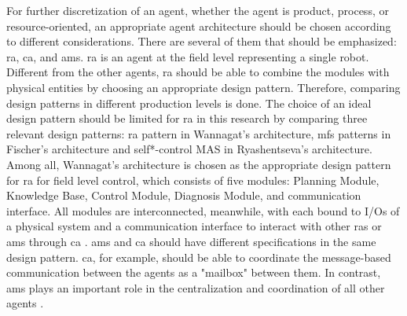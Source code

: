 For further discretization of an agent, whether the agent is product, 
process, or resource-oriented, an appropriate agent architecture should 
be chosen according to different considerations. There are several of 
them that should be emphasized: \gls{ra}, \gls{ca}, and \gls{ams}. 
\gls{ra} is an agent at the field level representing a single robot. 
Different from the other agents, \gls{ra} should be able to combine 
the modules with physical entities by choosing an appropriate design 
pattern. Therefore, comparing design patterns in different production 
levels is done\cite{ocker_leveraging_2021}. The choice of an ideal 
design pattern should be limited for \gls{ra} in this research by 
comparing three relevant design patterns:  \gls{ra} pattern in Wannagat’s 
architecture, \gls{mfs} patterns in Fischer’s architecture and 
self*-control 
MAS in Ryashentseva’s architecture. Among all,  Wannagat’s architecture 
is chosen as the appropriate design pattern for \gls{ra} for field level 
control, which consists of five modules: Planning Module, Knowledge Base, 
Control Module, Diagnosis Module, and communication interface. 
All modules are interconnected, meanwhile, with each bound to 
I/Os of a physical system and a communication interface to interact 
with other \gls{ras} or \gls{ams} through \gls{ca} \cite{cruz_salazar_cyber-physical_2019}. 
\gls{ams} and \gls{ca} should have different specifications in the 
same design pattern. \gls{ca}, for example, should be able to coordinate 
the message-based communication between the agents as a "mailbox" 
between them. In contrast, \gls{ams} plays an important role in the 
centralization and coordination of all other agents \cite{wannagat_entwicklung_2010}. 




